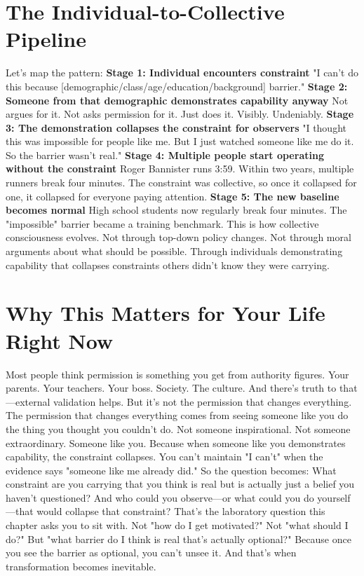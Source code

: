 \section{The Individual-to-Collective Pipeline}

Let's map the pattern:
\textbf{Stage 1: Individual encounters constraint}
"I can't do this because [demographic/class/age/education/background] barrier."
\textbf{Stage 2: Someone from that demographic demonstrates capability anyway}
Not argues for it. Not asks permission for it. Just does it. Visibly. Undeniably.
\textbf{Stage 3: The demonstration collapses the constraint for observers}
"I thought this was impossible for people like me. But I just watched someone like me do it. So the barrier wasn't real."
\textbf{Stage 4: Multiple people start operating without the constraint}
Roger Bannister runs 3:59. Within two years, multiple runners break four minutes. The constraint was collective, so once it collapsed for one, it collapsed for everyone paying attention.
\textbf{Stage 5: The new baseline becomes normal}
High school students now regularly break four minutes. The "impossible" barrier became a training benchmark.
This is how collective consciousness evolves.
Not through top-down policy changes. Not through moral arguments about what should be possible.
Through individuals demonstrating capability that collapses constraints others didn't know they were carrying.

\section{Why This Matters for Your Life Right Now}

Most people think permission is something you get from authority figures.
Your parents. Your teachers. Your boss. Society. The culture.
And there's truth to that—external validation helps. But it's not the permission that changes everything.
The permission that changes everything comes from seeing someone like you do the thing you thought you couldn't do.
Not someone inspirational. Not someone extraordinary. Someone like you.
Because when someone like you demonstrates capability, the constraint collapses. You can't maintain "I can't" when the evidence says "someone like me already did."
So the question becomes:
What constraint are you carrying that you think is real but is actually just a belief you haven't questioned?
And who could you observe—or what could you do yourself—that would collapse that constraint?
That's the laboratory question this chapter asks you to sit with.
Not "how do I get motivated?" Not "what should I do?" But "what barrier do I think is real that's actually optional?"
Because once you see the barrier as optional, you can't unsee it. And that's when transformation becomes inevitable.

